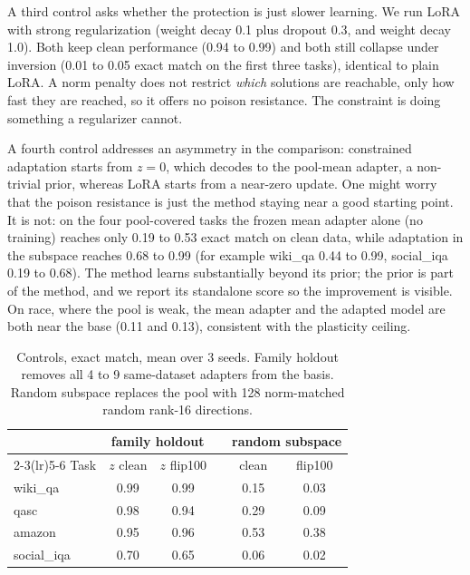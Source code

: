\documentclass[10pt]{article}
\begin{document}
A third control asks whether the protection is just slower learning. We run
LoRA with strong regularization (weight decay 0.1 plus dropout 0.3, and weight
decay 1.0). Both keep clean performance (0.94 to 0.99) and both still collapse
under inversion (0.01 to 0.05 exact match on the first three tasks), identical
to plain LoRA. A norm penalty does not restrict \emph{which} solutions are
reachable, only how fast they are reached, so it offers no poison resistance.
The constraint is doing something a regularizer cannot.

A fourth control addresses an asymmetry in the comparison: constrained
adaptation starts from $z=0$, which decodes to the pool-mean adapter, a
non-trivial prior, whereas LoRA starts from a near-zero update. One might worry
that the poison resistance is just the method staying near a good starting
point. It is not: on the four pool-covered tasks the frozen mean adapter alone
(no training) reaches only 0.19 to 0.53 exact match on clean data, while
adaptation in the subspace reaches 0.68 to 0.99 (for example wiki\_qa 0.44 to
0.99, social\_iqa 0.19 to 0.68). The method learns substantially beyond its
prior; the prior is part of the method, and we report its standalone score so
the improvement is visible. On race, where the pool is weak, the mean adapter
and the adapted model are both near the base (0.11 and 0.13), consistent with
the plasticity ceiling.

\begin{table}[t]
  \centering
  \caption{Controls, exact match, mean over 3 seeds. Family holdout removes all
  4 to 9 same-dataset adapters from the basis. Random subspace replaces the pool
  with 128 norm-matched random rank-16 directions.}
  \label{tab:controls}
  \small
  \begin{tabular}{lcc c cc}
    \toprule
    & \multicolumn{2}{c}{family holdout} & & \multicolumn{2}{c}{random subspace} \\
    \cmidrule(lr){2-3}\cmidrule(lr){5-6}
    Task & $z$ clean & $z$ flip100 & & clean & flip100 \\
    \midrule
    wiki\_qa    & 0.99 & 0.99 & & 0.15 & 0.03 \\
    qasc        & 0.98 & 0.94 & & 0.29 & 0.09 \\
    amazon      & 0.95 & 0.96 & & 0.53 & 0.38 \\
    social\_iqa & 0.70 & 0.65 & & 0.06 & 0.02 \\
    \bottomrule
  \end{tabular}
\end{table}
\end{document}
